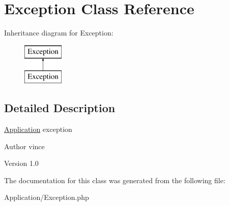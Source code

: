 \hypertarget{class_anemo_1_1_application_1_1_exception}{
\section{Exception Class Reference}
\label{class_anemo_1_1_application_1_1_exception}
}
Inheritance diagram for Exception:\begin{figure}[H]
\begin{center}
\leavevmode
\includegraphics[height=2.000000cm]{class_anemo_1_1_application_1_1_exception}
\end{center}
\end{figure}


\subsection{Detailed Description}
\hyperlink{class_anemo_1_1_application}{Application} exception \begin{DoxyAuthor}{Author}
vince 
\end{DoxyAuthor}
\begin{DoxyVersion}{Version}
1.0 
\end{DoxyVersion}


The documentation for this class was generated from the following file:\begin{DoxyCompactItemize}
\item 
Application/Exception.php\end{DoxyCompactItemize}

